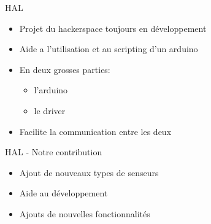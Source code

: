 \documentclass{beamer}
\begin{document}
		\begin{frame}{HAL}
			\begin{itemize}
				\item Projet du hackerspace toujours en développement
				\item Aide a l'utilisation et au scripting d'un arduino
				\item En deux grosses parties:
				\begin{itemize}
					\item l'arduino
					\item le driver
				\end{itemize}
				\item Facilite la communication entre les deux
			\end{itemize}
		\end{frame}

		\begin{frame}{HAL - Notre contribution}
			\begin{itemize}
				\item Ajout de nouveaux types de senseurs
				\item Aide au développement
				\item Ajouts de nouvelles fonctionnalités
			\end{itemize}
		\end{frame}
\end{document}
